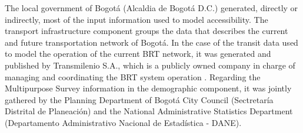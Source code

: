 \documentclass[12pt, a4paper]{report}
\begin{document}
\begin{table}[H]
\centering
\renewcommand{\arraystretch}{1.6} %
\caption{Input data summary.}
\label{tab:Data_summary}
\end{table}

The local government of Bogotá (Alcaldia de Bogotá D.C.) generated, directly or indirectly, most of the input information used to model accessibility. The transport infrastructure component groups the data that describes the current and future transportation network of Bogotá. In the case of the transit data used to model the operation of the current BRT network, it was generated and published by Transmilenio S.A., which is a publicly owned company in charge of managing and coordinating the BRT system operation \citep{transmilenios.a.HistoriaTransmilenioHistory2013}. Regarding the Multipurpose Survey information in the demographic component, it was jointly gathered by the Planning Department of Bogotá City Council (Sectretaría Distrital de Planeación) and the National Administrative Statistics Department (Departamento Administrativo Nacional de Estadística - DANE).
\end{document}
